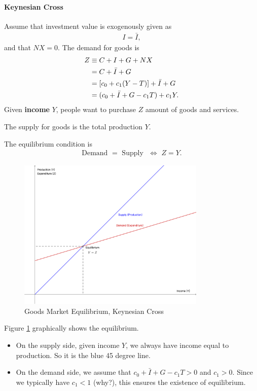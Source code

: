 \documentclass[12pt]{article}
\begin{document}
\paragraph{Keynesian Cross}
Assume that investment value is exogenously given as
\begin{align*}
    I = \bar{I},
\end{align*}
and that $NX=0$. 
The demand for goods is
\begin{align}\label{eq:demand_v1}
    Z &\equiv C + I + G + NX \notag \\
    &= C + \bar{I} + G \notag \\
    &= [c_0 + c_1(Y-T)] + \bar{I} + G \notag \\
    &= (c_0 + \bar{I} + G - c_1T) + c_1Y.
\end{align}
Given \textbf{income} $Y$, people want to purchase $Z$ amount of goods and services.

The supply for goods is the total production $Y$. 

The equilibrium condition is
\begin{align}\label{eq:eqm_cond}
    \text{Demand } = \text{ Supply }\,\, \iff \,\, Z = Y.
\end{align}

\begin{figure}[htp]
    \centering
    \includegraphics[width=0.8\textwidth]{keynesian_cross_0.png}
    \caption{Goods Market Equilibrium, Keynesian Cross}
    \label{fig:key_cross_v1}
\end{figure}

Figure \ref{fig:key_cross_v1} graphically shows the equilibrium. 
\begin{itemize}
    \item On the supply side, given income $Y$, we always have income equal to production. So it is the blue 45 degree line.
    \item On the demand side, we assume that $c_0 + \bar{I} + G - c_1T > 0$ and $c_1 > 0$. Since we typically have $c_1<1$ (why?), this ensures the existence of equilibrium.
\end{itemize}
\end{document}
